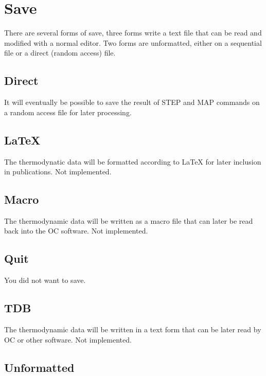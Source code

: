 \documentclass[12pt]{article}
\begin{document}
\section{Save }

There are several forms of save, three forms write a text file that
can be read and modified with a normal editor.  Two forms are
unformatted, either on a sequential file or a direct (random access)
file.

\subsection{Direct}

It will eventually be possible to save the result of STEP and MAP
commands on a random access file for later processing.

\subsection{LaTeX}

The thermodynatic data will be formatted according to LaTeX for later
inclusion in publications.  Not implemented.

\subsection{Macro}

The thermodynamic data will be written as a macro file that can later
be read back into the OC software.  Not implemented.

\subsection{Quit}

You did not want to save.

\subsection{TDB}

The thermodynamic data will be written in a text form that can be later
read by OC or other software.  Not implemented.

\subsection{Unformatted}
\end{document}
